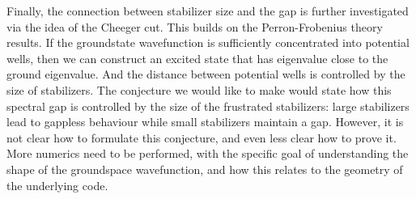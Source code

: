 Finally, the connection between stabilizer size and the gap is further 
investigated via the idea of the Cheeger cut. 
This builds on the Perron-Frobenius theory results.
If the groundstate wavefunction is sufficiently concentrated
into potential wells, then we can construct an excited state
that has eigenvalue close to the ground eigenvalue.
And the distance between potential wells is controlled by
the size of stabilizers.
The conjecture we would like to make would state 
how this spectral gap is controlled by the size of the frustrated
stabilizers: large stabilizers lead to gappless behaviour while
small stabilizers maintain a gap.
However, it is not clear how to formulate this conjecture, and
even less clear how to prove it. 
More numerics need to be performed, with the specific
goal of understanding the shape of the groundspace wavefunction,
and how this relates to the geometry of the underlying code.

%
%
%
%
%
%
%
%
%

